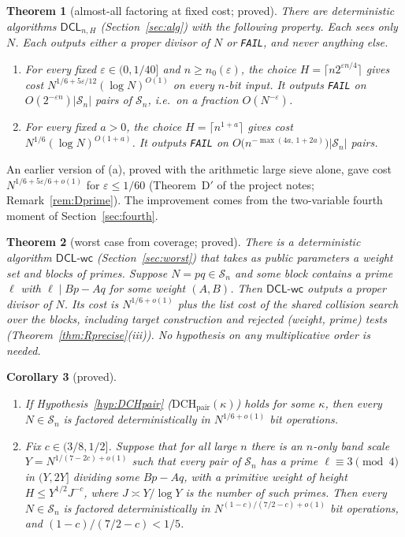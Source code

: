 \documentclass[11pt]{amsart}
\newtheorem{theorem}{Theorem}[section]
\newtheorem{corollary}[theorem]{Corollary}
\theoremstyle{definition}
\newcommand{\Sn}{\mathcal{S}_n}
\newcommand{\DCL}{\textsf{DCL}}
\newcommand{\DCLwc}{\textsf{DCL-wc}}
\begin{document}
\begin{theorem}[almost-all factoring at fixed cost; proved]\label{thm:D}
There are deterministic algorithms $\DCL_{n,H}$ (Section~\ref{sec:alg}) with the following
property. Each sees only $N$. Each outputs either a proper divisor of $N$ or \texttt{FAIL}, and
never anything else.
\begin{enumerate}[label=(\alph*)]
\item For every fixed $\varepsilon\in(0,1/40]$ and $n\ge n_0(\varepsilon)$, the choice
  $H=\lceil n2^{\varepsilon n/4}\rceil$ gives cost $N^{1/6+5\varepsilon/12}(\log N)^{O(1)}$ on
  every $n$-bit input. It outputs \texttt{FAIL} on $O(2^{-\varepsilon n})|\Sn|$ pairs of $\Sn$,
  i.e.\ on a fraction $O(N^{-\varepsilon})$.
\item For every fixed $a>0$, the choice $H=\lceil n^{1+a}\rceil$ gives cost
  $N^{1/6}(\log N)^{O(1+a)}$. It outputs \texttt{FAIL} on
  $O\bigl(n^{-\max(4a,\,1+2a)}\bigr)|\Sn|$ pairs.
\end{enumerate}
\end{theorem}

An earlier version of (a), proved with the arithmetic large sieve alone, gave cost
$N^{1/6+5\varepsilon/6+o(1)}$ for $\varepsilon\le1/60$ (Theorem~D$'$ of the project notes;
Remark~\ref{rem:Dprime}). The improvement comes from the two-variable fourth moment of
Section~\ref{sec:fourth}.

\begin{theorem}[worst case from coverage; proved]\label{thm:R}
There is a deterministic algorithm $\DCLwc$ (Section~\ref{sec:worst}) that takes as public
parameters a weight set and blocks of primes. Suppose $N=pq\in\Sn$ and some block contains a
prime $\ell$ with $\ell\mid Bp-Aq$ for some weight $(A,B)$. Then $\DCLwc$ outputs a proper divisor
of $N$. Its cost is $N^{1/6+o(1)}$ plus the list cost of the shared collision search over the blocks,
including target construction and rejected (weight, prime) tests
(Theorem~\ref{thm:Rprecise}(iii)). No hypothesis on any multiplicative order is needed.
\end{theorem}

\begin{corollary}[proved]\label{cor:conditional}
\begin{enumerate}[label=(\alph*)]
\item If Hypothesis~\ref{hyp:DCHpair} ($\mathrm{DCH}_{\mathrm{pair}}(\kappa)$) holds for some
  $\kappa$, then every $N\in\Sn$ is factored deterministically in $N^{1/6+o(1)}$ bit operations.
\item Fix $c\in(3/8,1/2]$. Suppose that for all large $n$ there is an $n$-only band scale
  $Y=N^{1/(7-2c)+o(1)}$ such that every pair of $\Sn$ has a prime $\ell\equiv3\pmod4$ in
  $(Y,2Y]$ dividing some $Bp-Aq$, with a primitive weight of height $H\le Y^{1/2}J^{-c}$, where
  $J\asymp Y/\log Y$ is the number of such primes. Then every $N\in\Sn$ is factored
  deterministically in $N^{(1-c)/(7/2-c)+o(1)}$ bit operations, and $(1-c)/(7/2-c)<1/5$.
\end{enumerate}
\end{corollary}
\end{document}
